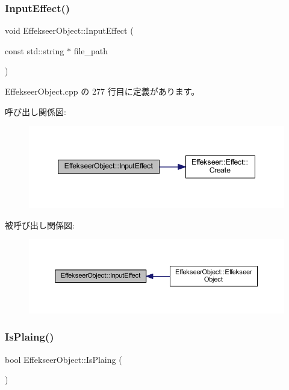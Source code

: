 \subsubsection{\texorpdfstring{Input\+Effect()}{InputEffect()}}
{\footnotesize\ttfamily void Effekseer\+Object\+::\+Input\+Effect (\begin{DoxyParamCaption}\item[{const std\+::string $\ast$}]{file\+\_\+path }\end{DoxyParamCaption})\hspace{0.3cm}{\ttfamily [private]}}



 Effekseer\+Object.\+cpp の 277 行目に定義があります。

呼び出し関係図\+:\nopagebreak
\begin{figure}[H]
\begin{center}
\leavevmode
\includegraphics[width=347pt]{class_effekseer_object_a1566339dd4acebff341a867a2fd05c17_cgraph}
\end{center}
\end{figure}
被呼び出し関係図\+:\nopagebreak
\begin{figure}[H]
\begin{center}
\leavevmode
\includegraphics[width=350pt]{class_effekseer_object_a1566339dd4acebff341a867a2fd05c17_icgraph}
\end{center}
\end{figure}
\mbox{\label{class_effekseer_object_a6fe253dd3387bdfd9305878ff194f305}} 
\subsubsection{\texorpdfstring{Is\+Plaing()}{IsPlaing()}}
{\footnotesize\ttfamily bool Effekseer\+Object\+::\+Is\+Plaing (\begin{DoxyParamCaption}{ }\end{DoxyParamCaption})\hspace{0.3cm}{\ttfamily [inline]}}



